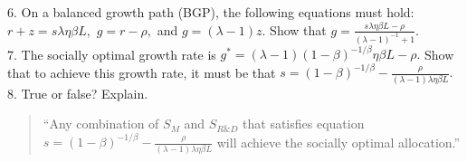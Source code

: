\documentclass[11pt]{article}
\begin{document}
6. On a balanced growth path (BGP), the following equations must hold: $r+z=s\lambda\eta\beta L,$ $g=r-\rho,$ and $g=(\lambda-1)z.$ Show that $g=\frac{s\lambda\eta\beta L-\rho}{(\lambda-1)^{-1}+1}.$\\

7. The socially optimal growth rate is $g^*=(\lambda-1)(1-\beta)^{-1/\beta}\eta\beta L-\rho.$ Show that to achieve this growth rate, it must be that $s=(1-\beta)^{-1/\beta}-\frac{\rho}{(\lambda-1)\lambda\eta\beta L}.$\\

8. True or false? Explain.
\begin{quote}
``Any combination of $S_M$ and $S_{R\&D}$ that satisfies equation $s=(1-\beta)^{-1/\beta}-\frac{\rho}{(\lambda-1)\lambda\eta\beta L}$ will achieve the socially optimal allocation.''
\end{quote}
\end{document}

